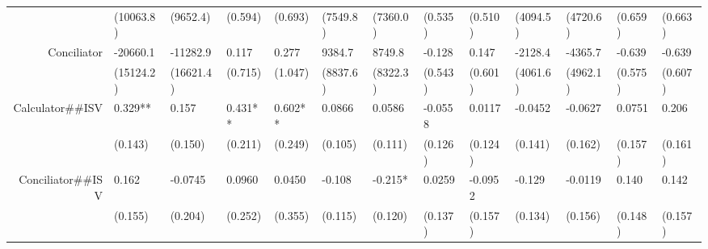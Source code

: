 \begin{tabular}{rrrrrrrrrrrrr}
      & \multicolumn{1}{l}{(10063.8)} & \multicolumn{1}{l}{(9652.4)} & \multicolumn{1}{l}{(0.594)} & \multicolumn{1}{l}{(0.693)} & \multicolumn{1}{l}{(7549.8)} & \multicolumn{1}{l}{(7360.0)} & \multicolumn{1}{l}{(0.535)} & \multicolumn{1}{l}{(0.510)} & \multicolumn{1}{l}{(4094.5)} & \multicolumn{1}{l}{(4720.6)} & \multicolumn{1}{l}{(0.659)} & \multicolumn{1}{l}{(0.663)} \\
Conciliator & \multicolumn{1}{l}{-20660.1} & \multicolumn{1}{l}{-11282.9} & \multicolumn{1}{l}{0.117} & \multicolumn{1}{l}{0.277} & \multicolumn{1}{l}{9384.7} & \multicolumn{1}{l}{8749.8} & \multicolumn{1}{l}{-0.128} & \multicolumn{1}{l}{0.147} & \multicolumn{1}{l}{-2128.4} & \multicolumn{1}{l}{-4365.7} & \multicolumn{1}{l}{-0.639} & \multicolumn{1}{l}{-0.639} \\
      & \multicolumn{1}{l}{(15124.2)} & \multicolumn{1}{l}{(16621.4)} & \multicolumn{1}{l}{(0.715)} & \multicolumn{1}{l}{(1.047)} & \multicolumn{1}{l}{(8837.6)} & \multicolumn{1}{l}{(8322.3)} & \multicolumn{1}{l}{(0.543)} & \multicolumn{1}{l}{(0.601)} & \multicolumn{1}{l}{(4061.6)} & \multicolumn{1}{l}{(4962.1)} & \multicolumn{1}{l}{(0.575)} & \multicolumn{1}{l}{(0.607)} \\
Calculator\#\#ISV & \multicolumn{1}{l}{0.329**} & \multicolumn{1}{l}{0.157} & \multicolumn{1}{l}{0.431**} & \multicolumn{1}{l}{0.602**} & \multicolumn{1}{l}{0.0866} & \multicolumn{1}{l}{0.0586} & \multicolumn{1}{l}{-0.0558} & \multicolumn{1}{l}{0.0117} & \multicolumn{1}{l}{-0.0452} & \multicolumn{1}{l}{-0.0627} & \multicolumn{1}{l}{0.0751} & \multicolumn{1}{l}{0.206} \\
      & \multicolumn{1}{l}{(0.143)} & \multicolumn{1}{l}{(0.150)} & \multicolumn{1}{l}{(0.211)} & \multicolumn{1}{l}{(0.249)} & \multicolumn{1}{l}{(0.105)} & \multicolumn{1}{l}{(0.111)} & \multicolumn{1}{l}{(0.126)} & \multicolumn{1}{l}{(0.124)} & \multicolumn{1}{l}{(0.141)} & \multicolumn{1}{l}{(0.162)} & \multicolumn{1}{l}{(0.157)} & \multicolumn{1}{l}{(0.161)} \\
Conciliator\#\#ISV & \multicolumn{1}{l}{0.162} & \multicolumn{1}{l}{-0.0745} & \multicolumn{1}{l}{0.0960} & \multicolumn{1}{l}{0.0450} & \multicolumn{1}{l}{-0.108} & \multicolumn{1}{l}{-0.215*} & \multicolumn{1}{l}{0.0259} & \multicolumn{1}{l}{-0.0952} & \multicolumn{1}{l}{-0.129} & \multicolumn{1}{l}{-0.0119} & \multicolumn{1}{l}{0.140} & \multicolumn{1}{l}{0.142} \\
      & \multicolumn{1}{l}{(0.155)} & \multicolumn{1}{l}{(0.204)} & \multicolumn{1}{l}{(0.252)} & \multicolumn{1}{l}{(0.355)} & \multicolumn{1}{l}{(0.115)} & \multicolumn{1}{l}{(0.120)} & \multicolumn{1}{l}{(0.137)} & \multicolumn{1}{l}{(0.157)} & \multicolumn{1}{l}{(0.134)} & \multicolumn{1}{l}{(0.156)} & \multicolumn{1}{l}{(0.148)} & \multicolumn{1}{l}{(0.157)} \\

\end{tabular}
